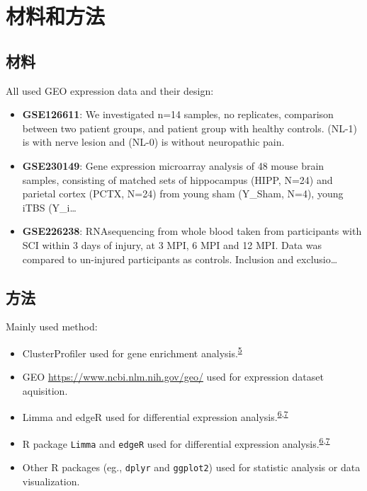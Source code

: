 \documentclass[
]{article}
\providecommand{\tightlist}{%
  \setlength{\itemsep}{0pt}\setlength{\parskip}{0pt}}
\begin{document}
\hypertarget{methods}{%
\section{材料和方法}\label{methods}}

\hypertarget{ux6750ux6599}{%
\subsection{材料}\label{ux6750ux6599}}

All used GEO expression data and their design:

\begin{itemize}
\item
  \textbf{GSE126611}: We investigated n=14 samples, no replicates, comparison between two patient groups, and patient group with healthy controls. (NL-1) is with nerve lesion and (NL-0) is without neuropathic pain.
\item
  \textbf{GSE230149}: Gene expression microarray analysis of 48 mouse brain samples, consisting of matched sets of hippocampus (HIPP, N=24) and parietal cortex (PCTX, N=24) from young sham (Y\_Sham, N=4), young iTBS (Y\_i\ldots{}
\item
  \textbf{GSE226238}: RNAsequencing from whole blood taken from participants with SCI within 3 days of injury, at 3 MPI, 6 MPI and 12 MPI. Data was compared to un-injured participants as controls. Inclusion and exclusio\ldots{}
\end{itemize}

\hypertarget{ux65b9ux6cd5}{%
\subsection{方法}\label{ux65b9ux6cd5}}

Mainly used method:

\begin{itemize}
\tightlist
\item
  ClusterProfiler used for gene enrichment analysis.\textsuperscript{\protect\hyperlink{ref-ClusterprofilerWuTi2021}{5}}
\item
  GEO \url{https://www.ncbi.nlm.nih.gov/geo/} used for expression dataset aquisition.
\item
  Limma and edgeR used for differential expression analysis.\textsuperscript{\protect\hyperlink{ref-LimmaPowersDiRitchi2015}{6},\protect\hyperlink{ref-EdgerDifferenChen}{7}}
\item
  R package \texttt{Limma} and \texttt{edgeR} used for differential expression analysis.\textsuperscript{\protect\hyperlink{ref-LimmaPowersDiRitchi2015}{6},\protect\hyperlink{ref-EdgerDifferenChen}{7}}
\item
  Other R packages (eg., \texttt{dplyr} and \texttt{ggplot2}) used for statistic analysis or data visualization.
\end{itemize}
\end{document}

